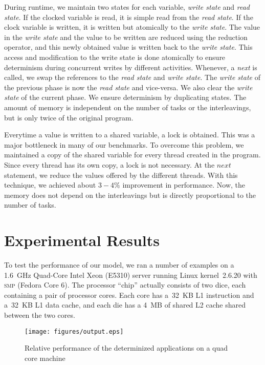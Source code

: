 \documentclass[10pt, conference, compsocconf]{IEEEtran}
\begin{document}
During runtime, we maintain two states for each variable, \emph{write state} and \emph{read state}.
If the clocked variable is read, it is simple read from the \emph{read state}. If the clock
variable is written, it is written but atomically to the \emph{write state}.  The value in the \emph{write
state} and the value to be written are reduced using the reduction operator, and this newly obtained
value is written back to the \emph{write state}. This access and modification to the write state is done
atomically to ensure determinism during concurrent writes by different activities.
Whenever, a \emph{next} is called, we swap the references to the \emph{read state} and \emph{write state}.
The \emph{write state} of the previous phase is now the \emph{read state} and vice-versa.
We also clear the \emph{write state} of the current phase.
We ensure determinism by duplicating states. The amount of memory is independent on the number
of tasks or the interleavings, but is only twice of the original program.


Everytime a value is written to a shared variable, a lock is obtained. This was a major
bottleneck in many of our benchmarks. To overcome this problem, we maintained a copy
of the shared variable for every thread created in the program. Since every thread
has its own copy, a lock is not necessary. At the $next$ statement, we reduce
the values offered by the different threads. With this technique, we achieved
about $3-4\%$ improvement in performance. Now, the memory does not depend
on the interleavings but is directly proportional to the number of tasks.




\section{Experimental Results}
\label{sec:experimental}

To test the performance of our model, we ran a number of examples on a 1.6~GHz
Quad-Core Intel Xeon (E5310) server running Linux kernel~2.6.20 with
\textsc{smp} (Fedora Core 6).  The processor ``chip'' actually
consists of two dice, each containing a pair of processor cores.  Each
core has a~32~KB L1 instruction and a~32~KB L1 data cache, and each
die has a 4~MB of shared L2 cache shared between the two cores.

\begin{figure*}[htbp]
\texttt{[image: figures/output.eps]}
\caption{Relative performance of the determinized applications on a quad core machine}
\label{fig:output}
\end{figure*}
\end{document}

